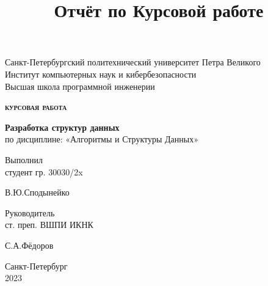 \documentclass[a4paper, 12pt] {article}
\title{Отчёт по Курсовой работе}
\begin{document}

\thispagestyle{empty}                   %

\begin{center}
   Санкт-Петербургский политехнический университет Петра Великого\\
   Институт компьютерных наук и кибербезопасности\\
   Высшая школа программной инженерии
\end{center}

\vspace{20ex}                %

\begin{center}
   \begin{LARGE}
     {\bfseries{\scshape курсовая работа}}
   \end{LARGE}

   \vspace{3ex}

   \begin{large}
     {\bfseries Разработка структур данных\\}
   по дисциплине: «Алгоритмы и Структуры Данных»
   \end{large}
\end{center}

\vspace{30ex}

\noindent Выполнил\\
студент гр. 30030/2x \hfill \begin{minipage}{0.6\textwidth}\hfill
  В.Ю.Сподынейко\end{minipage}

\vspace{3ex}

\noindent Руководитель\\
ст. преп. ВШПИ ИКНК\hfill \begin{minipage} {0.6\textwidth}\hfill
  С.А.Фёдоров\end{minipage}

\vfill

\begin{center}
   Санкт-Петербург\\
   2023
\end{center}

\newpage
\tableofcontents
\end{document}
